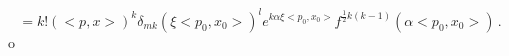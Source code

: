 \begin{equation} = k! (<p , x>)^k \delta_{m
k} (\xi<p_0 , x_0>)^l e^{k \alpha \xi <p_0,x_0>}
f^{\frac{1}{2}k(k-1)}(\alpha<p_0,x_0>)\,
.\label{427}\end{equation}o
